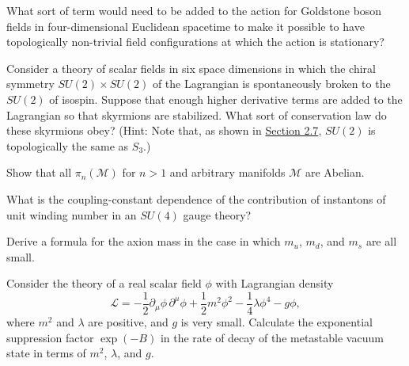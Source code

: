 
\begin{enumerate}
 What sort of term would need to be added to the action for Goldstone
boson fields in four-dimensional Euclidean spacetime to make it possible to
have topologically non-trivial field configurations at which the action is
stationary?

 Consider a theory of scalar fields in six space dimensions in which
the chiral symmetry $SU(2)\times SU(2)$ of the Lagrangian is spontaneously
broken to the $SU(2)$ of isospin. Suppose that enough higher derivative
terms are added to the Lagrangian so that skyrmions are stabilized. What
sort of conservation law do these skyrmions obey? (Hint: Note that, as
shown in \hyperref[sec:2.7]{Section 2.7}, $SU(2)$ is topologically the same
as $S_3$.)

 Show that all $\pi_n(\mathcal M)$ for $n>1$ and arbitrary manifolds
$\mathcal M$ are Abelian.

 What is the coupling-constant dependence of the contribution of
instantons of unit winding number in an $SU(4)$ gauge theory?

 Derive a formula for the axion mass in the case in which $m_u$,
$m_d$, and $m_s$ are all small.

 Consider the theory of a real scalar field $\phi$ with Lagrangian
density
\[
 \mathcal L=-\frac12\partial_\mu\phi\,\partial^\mu\phi
 +\frac12m^2\phi^2-\frac14\lambda\phi^4-g\phi,
\]
where $m^2$ and $\lambda$ are positive, and $g$ is very small. Calculate
the exponential suppression factor $\exp(-B)$ in the rate of decay of the
metastable vacuum state in terms of $m^2$, $\lambda$, and $g$.
\end{enumerate}
